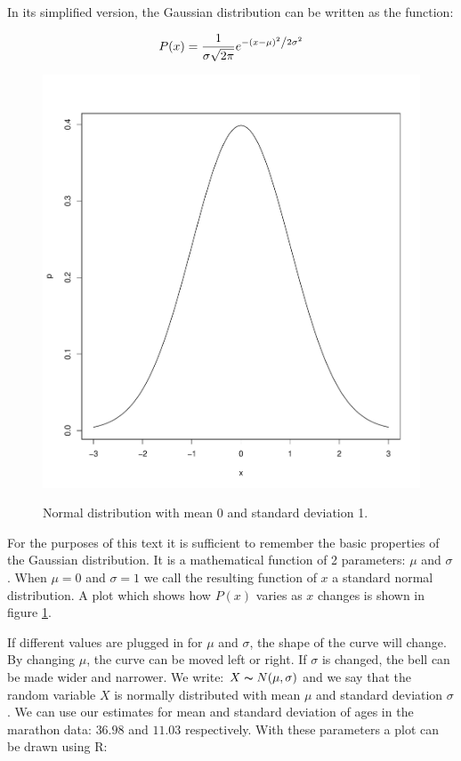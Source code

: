 \documentclass{tufte-book} %
\begin{document}
In its simplified version, the Gaussian distribution can be written as the function:

\begin{equation} \label{formula:normal-distribution}
	P(x) = \frac{1}{{\sigma \sqrt {2\pi } }}
	e^{{{ - \left( {x - \mu } \right)^2 } 
			\mathord{\left/ {\vphantom 
					{{ - \left( {x - \mu } \right)^2 } {2\sigma ^2 }}} 
				\right. \kern-\nulldelimiterspace} {2\sigma ^2 }}}
\end{equation}

\begin{figure}
	\centering
	\includegraphics{graphics/plot-normal}
	\label{img:plot-normal}
	\caption{Normal distribution with mean 0 and standard deviation 1.}
\end{figure}

For the purposes of this text it is sufficient to remember the basic properties of the Gaussian distribution. It is a mathematical function of 2 parameters: $\mu$ and $\sigma$. When $\mu = 0$ and $\sigma = 1$ we call the resulting function of $x$ a standard normal distribution. A plot which shows how $P(x)$ varies as $x$ changes is shown in figure \ref{img:plot-normal}. 

If different values are plugged in for $\mu$ and $\sigma$, the shape of the curve will change. By changing $\mu$, the curve can be moved left or right. If $\sigma$ is changed, the bell can be made wider and narrower. We write: $X \thicksim N(\mu, \sigma)$ and we say that the random variable $X$ is normally distributed with mean $\mu$ and standard deviation $\sigma$. We can use our estimates for mean and standard deviation of ages in the marathon data: $36.98$ and $11.03$ respectively. With these parameters a plot can be drawn using R:
\end{document}

